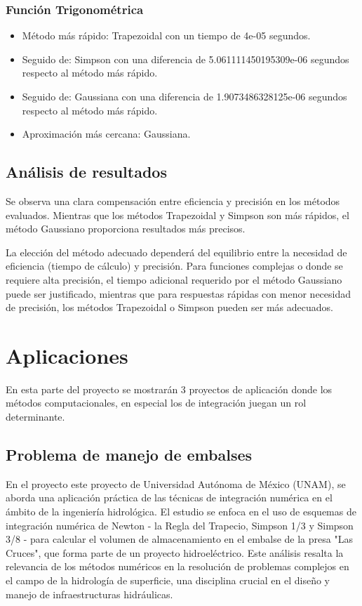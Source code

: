 \documentclass[a4paper]{article}
\begin{document}
    \subsubsection{Función Trigonométrica}
    \begin{itemize}
        \item Método más rápido: Trapezoidal con un tiempo de 4e-05 segundos.
        \item Seguido de: Simpson con una diferencia de 5.061111450195309e-06 segundos respecto al método más rápido.
        \item Seguido de: Gaussiana con una diferencia de 1.9073486328125e-06 segundos respecto al método más rápido.
        \item Aproximación más cercana: Gaussiana. 
    \end{itemize}
    
    \subsection{Análisis de resultados}
    Se observa una clara compensación entre eficiencia y precisión en los métodos evaluados. Mientras que los métodos Trapezoidal y Simpson son más rápidos, el método Gaussiano proporciona resultados más precisos. 
    
    La elección del método adecuado dependerá del equilibrio entre la necesidad de eficiencia (tiempo de cálculo) y precisión. Para funciones complejas o donde se requiere alta precisión, el tiempo adicional requerido por el método Gaussiano puede ser justificado, mientras que para respuestas rápidas con menor necesidad de precisión, los métodos Trapezoidal o Simpson pueden ser más adecuados.
    
    \section{Aplicaciones}
    En esta parte del proyecto se mostrarán 3 proyectos de aplicación donde los métodos computacionales, en especial los de integración juegan un rol determinante.

    \subsection{Problema de manejo de embalses}
    En el proyecto este proyecto de Universidad Autónoma de México (UNAM), se aborda una aplicación práctica de las técnicas de integración numérica en el ámbito de la ingeniería hidrológica. El estudio se enfoca en el uso de esquemas de integración numérica de Newton - la Regla del Trapecio, Simpson 1/3 y Simpson 3/8 - para calcular el volumen de almacenamiento en el embalse de la presa "Las Cruces", que forma parte de un proyecto hidroeléctrico. Este análisis resalta la relevancia de los métodos numéricos en la resolución de problemas complejos en el campo de la hidrología de superficie, una disciplina crucial en el diseño y manejo de infraestructuras hidráulicas.
\end{document}
